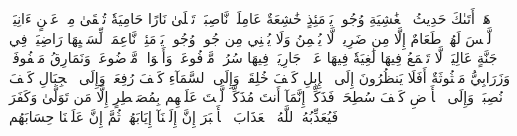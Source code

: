 هَلۡ أَتَىٰكَ حَدِيثُ ٱلۡغَٰشِيَةِ
وُجُوهٞ يَوۡمَئِذٍ خَٰشِعَةٌ
عَامِلَةٞ نَّاصِبَةٞ
تَصۡلَىٰ نَارًا حَامِيَةٗ
تُسۡقَىٰ مِنۡ عَيۡنٍ ءَانِيَةٖ
لَّيۡسَ لَهُمۡ طَعَامٌ إِلَّا مِن ضَرِيعٖ
لَّا يُسۡمِنُ وَلَا يُغۡنِي مِن جُوعٖ
وُجُوهٞ يَوۡمَئِذٖ نَّاعِمَةٞ
لِّسَعۡيِهَا رَاضِيَةٞ
فِي جَنَّةٍ عَالِيَةٖ
لَّا تَسۡمَعُ فِيهَا لَٰغِيَةٗ
فِيهَا عَيۡنٞ جَارِيَةٞ
فِيهَا سُرُرٞ مَّرۡفُوعَةٞ
وَأَكۡوَابٞ مَّوۡضُوعَةٞ
وَنَمَارِقُ مَصۡفُوفَةٞ
وَزَرَابِيُّ مَبۡثُوثَةٌ
أَفَلَا يَنظُرُونَ إِلَى ٱلۡإِبِلِ كَيۡفَ خُلِقَتۡ
وَإِلَى ٱلسَّمَآءِ كَيۡفَ رُفِعَتۡ
وَإِلَى ٱلۡجِبَالِ كَيۡفَ نُصِبَتۡ
وَإِلَى ٱلۡأَرۡضِ كَيۡفَ سُطِحَتۡ
فَذَكِّرۡ إِنَّمَآ أَنتَ مُذَكِّرٞ
لَّسۡتَ عَلَيۡهِم بِمُصَيۡطِرٍ
إِلَّا مَن تَوَلَّىٰ وَكَفَرَ
فَيُعَذِّبُهُ ٱللَّهُ ٱلۡعَذَابَ ٱلۡأَكۡبَرَ
إِنَّ إِلَيۡنَآ إِيَابَهُمۡ
ثُمَّ إِنَّ عَلَيۡنَا حِسَابَهُم